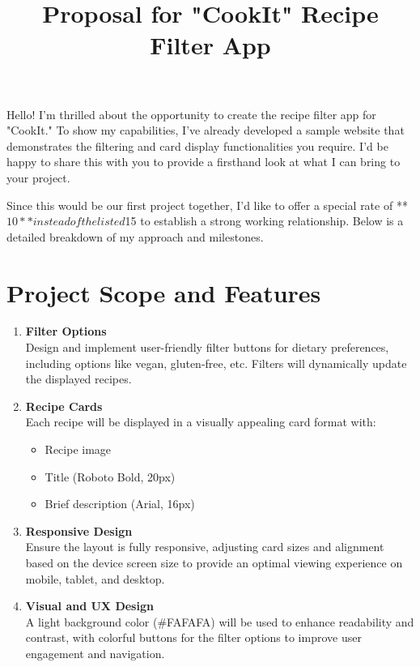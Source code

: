 \documentclass{article}
\title{\textbf{Proposal for "CookIt" Recipe Filter App}}
\author{}
\date{}
\begin{document}
\maketitle

\noindent
Hello! I’m thrilled about the opportunity to create the recipe filter app for "CookIt." To show my capabilities, I’ve already developed a sample website that demonstrates the filtering and card display functionalities you require. I’d be happy to share this with you to provide a firsthand look at what I can bring to your project.

Since this would be our first project together, I’d like to offer a special rate of **$10** instead of the listed $15 to establish a strong working relationship. Below is a detailed breakdown of my approach and milestones.

\section*{Project Scope and Features}

\begin{enumerate}[label=\arabic*.]
    \item \textbf{Filter Options} \\
    Design and implement user-friendly filter buttons for dietary preferences, including options like vegan, gluten-free, etc. Filters will dynamically update the displayed recipes.
    
    \item \textbf{Recipe Cards} \\
    Each recipe will be displayed in a visually appealing card format with:
    \begin{itemize}
        \item Recipe image
        \item Title (Roboto Bold, 20px)
        \item Brief description (Arial, 16px)
    \end{itemize}
    
    \item \textbf{Responsive Design} \\
    Ensure the layout is fully responsive, adjusting card sizes and alignment based on the device screen size to provide an optimal viewing experience on mobile, tablet, and desktop.
    
    \item \textbf{Visual and UX Design} \\
    A light background color (\#FAFAFA) will be used to enhance readability and contrast, with colorful buttons for the filter options to improve user engagement and navigation.
\end{enumerate}
\end{document}
